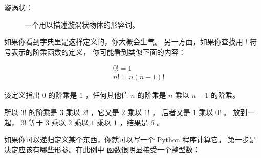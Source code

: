 
\begin{description}

\item[漩涡状：] 一个用以描述漩涡状物体的形容词。
    

\end{description}


如果你看到字典里是这样定义的，你大概会生气。
另一方面，如果你查找用 $!$ 符号表示的阶乘函数的定义， 你可能看到类似下面的内容：


%
\begin{eqnarray*}
&&  0! = 1 \\
&&  n! = n (n-1)!
\end{eqnarray*}

%

该定义指出 $0$ 的阶乘是 $1$ ，任何其他值 $n$ 的阶乘是 $n$ 乘以 $n-1$ 的阶乘。


所以 $3!$ 的阶乘是 $3$ 乘以 $2!$ ，它又是 $2$ 乘以 $1!$ ， 后者又是 $1$ 乘以 $0!$ 。 放到一起， $3!$ 等于 $3$ 乘以 $2$ 乘以 $1$ 乘以 $1$ ，结果是 $6$ 。
  


如果你可以递归定义某个东西，你就可以写一个 Python 程序计算它。
第一步是决定应该有哪些形参。在此例中  函数很明显接受一个整型数：

